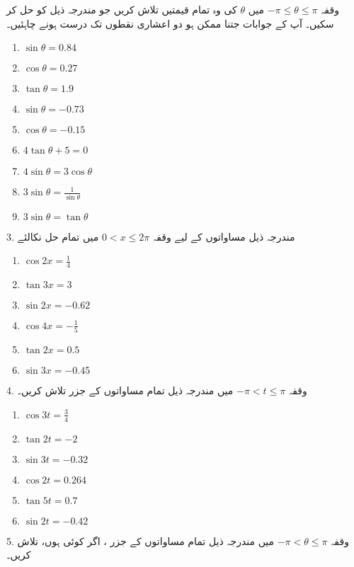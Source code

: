 وقفہ 
\(-\pi \le \theta \le \pi\)
میں
\(\theta\)
کی وہ تمام قیمتیں تلاش کریں جو مندرجہ ذیل کو حل کر سکیں۔ آپ کے جوابات جتنا ممکن ہو دو اعشاری نقطوں تک درست ہونے چاہئیں۔\\
\begin{multicols}{3}
\begin{enumerate}[a]
\item\(\sin\theta = 0.84\)
\item \(\cos\theta = 0.27\)
\item \(\tan\theta =1.9\)
\item \(\sin\theta = -0.73\)
\item \(\cos\theta = -0.15\)
\item \(4 \tan\theta + 5 = 0\)
\item \(4\sin\theta =3\cos \theta\)
\item \(3\sin\theta = \frac{1}{\sin\theta}\)
\item \(3\sin\theta =\tan\theta\)
\end{enumerate}
\end{multicols}
3. مندرجہ ذیل مساواتوں کے لیے وقفہ
\(0 < x \le 2\pi\)
میں تمام حل نکالئے
\begin{multicols}{3} 
\begin{enumerate}[a]
\item \(\cos2x =\frac{1}{4}\)
\item \(\tan3x=3\)
\item \(\sin 2x =-0.62\)
\item \(\cos 4x = - \frac{1}{5}\)
\item \(\tan 2x = 0.5\)
\item \(\sin 3x = -0.45\)
\end{enumerate}
\end{multicols}
4. وقفہ
\(-\pi<t \le \pi\)
میں مندرجہ ذیل تمام مساواتوں کے جزر تلاش کریں۔\\
\begin{multicols}{3} 
\begin{enumerate}[a]
\item \(\cos 3t =\frac{3}{4}\)
\item \(\tan2t=-2\)
\item \(\sin 3t = -0.32\)
\item \(\cos 2t = 0.264\)
\item \(\tan 5t =0.7\)
\item \(\sin 2t = -0.42\)
\end{enumerate}
\end{multicols}
5. وقفہ
\(-\pi < \theta \le \pi\)
میں مندرجہ ذیل تمام مساواتوں کے جزر ، اگر کوئی ہوں، تلاش کریں۔\\
